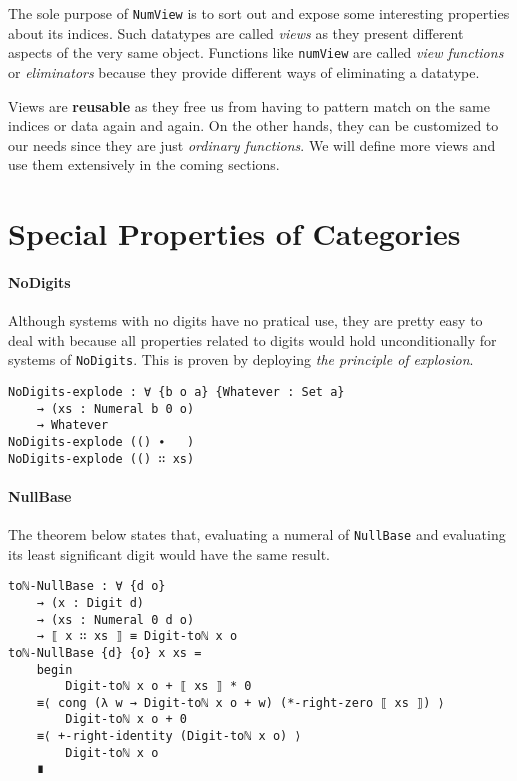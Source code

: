 \documentclass[../thesis.tex]{subfiles}
\begin{document}
The sole purpose of {\lstinline|NumView|} is to sort out and expose some
interesting properties about its indices.
Such datatypes are called \textit{views}\cite{wadler1987views} as they present
different aspects of the very same object.
Functions like {\lstinline|numView|} are called \textit{view functions} or
\textit{eliminators}\cite{mcbride2004views} because they provide different ways
of eliminating a datatype.

Views are \textbf{reusable} as they free us from having to pattern match on the
same indices or data again and again. On the other hands, they can be customized
to our needs since they are just \textit{ordinary functions}.
We will define more views and use them extensively in the coming sections.

\section{Special Properties of Categories}

\paragraph{NoDigits}

Although systems with no digits have no pratical use, they are pretty easy to deal
with because all properties related to digits would hold unconditionally for
systems of {\lstinline|NoDigits|}.
This is proven by deploying \textit{the principle of explosion}.

\begin{lstlisting}
NoDigits-explode : ∀ {b o a} {Whatever : Set a}
    → (xs : Numeral b 0 o)
    → Whatever
NoDigits-explode (() ∙   )
NoDigits-explode (() ∷ xs)
\end{lstlisting}

\paragraph{NullBase}

The theorem below states that, evaluating a numeral of {\lstinline|NullBase|}
and evaluating its least significant digit would have the same result.

\begin{lstlisting}
toℕ-NullBase : ∀ {d o}
    → (x : Digit d)
    → (xs : Numeral 0 d o)
    → ⟦ x ∷ xs ⟧ ≡ Digit-toℕ x o
toℕ-NullBase {d} {o} x xs =
    begin
        Digit-toℕ x o + ⟦ xs ⟧ * 0
    ≡⟨ cong (λ w → Digit-toℕ x o + w) (*-right-zero ⟦ xs ⟧) ⟩
        Digit-toℕ x o + 0
    ≡⟨ +-right-identity (Digit-toℕ x o) ⟩
        Digit-toℕ x o
    ∎
\end{lstlisting}
\end{document}
